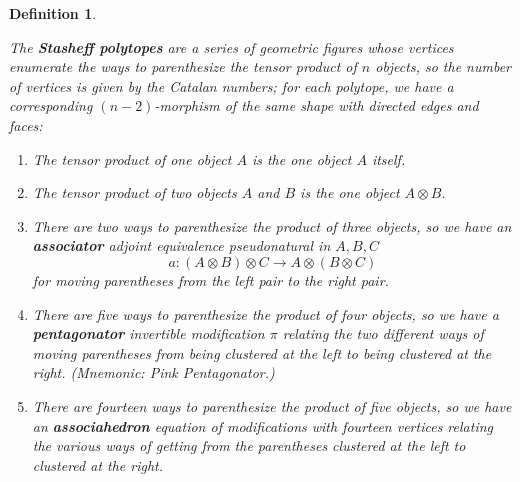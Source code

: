 \documentclass[12pt,twoside,openright]{report}
\newtheorem{defn}{Definition}
\newcommand{\maps}{\colon}
\newcommand{\tensor}{\otimes}
\begin{document}
\begin{defn}
\begin{itemize}
The {\bf Stasheff polytopes} \cite{Stasheff} are a series of geometric figures whose vertices enumerate the ways to parenthesize the tensor product of $n$ objects, so the number of vertices is given by the Catalan numbers; for each polytope, we have a corresponding $(n-2)$-morphism of the same shape with directed edges and faces:
  \begin{enumerate}
    \item The tensor product of one object $A$ is the one object $A$ itself.
    \item The tensor product of two objects $A$ and $B$ is the one object $A \tensor B$.
    \item There are two ways to parenthesize the product of three objects, so we have an {\bf associator} adjoint equivalence pseudonatural in $A,B,C$
        \[ a\maps (A\tensor B) \tensor C \rightarrow A \tensor (B\tensor C) \]
      for moving parentheses from the left pair to the right pair.
    \item There are five ways to parenthesize the product of four objects, so we have a {\bf pentagonator} invertible modification $\pi$ relating the two different ways of moving parentheses from being clustered at the left to being clustered at the right.  (Mnemonic: Pink Pentagonator.)
      \begin{center}
      \end{center}
    \item There are fourteen ways to parenthesize the product of five objects, so we have an {\bf associahedron} equation of modifications with fourteen vertices relating the various ways of getting from the parentheses clustered at the left to clustered at the right.

\end{enumerate}
\end{itemize}
\end{defn}
\end{document}

